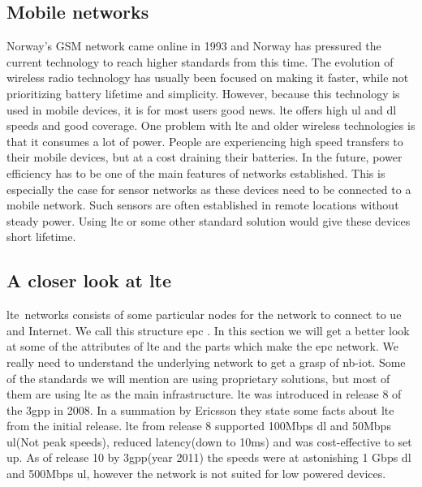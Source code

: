 \documentclass[USenglish]{ifimaster}  %
\begin{document}
\subsection{Mobile networks}
Norway's GSM network came online in 1993 \cite{online:gsmTelenorNetcom} and Norway has pressured the current technology to reach higher standards from this time. The evolution of wireless radio technology has usually been focused on making it faster, while not prioritizing battery lifetime and simplicity. However, because this technology is used in mobile devices, it is for most users good news. \acrshort{lte} offers high \acrfull{ul} and \acrfull{dl} speeds and good coverage. One problem with \acrshort{lte} and older wireless technologies is that it consumes a lot of power. People are experiencing high speed transfers to their mobile devices, but at a cost draining their batteries. In the future, power efficiency has to be one of the main features of networks established. This is especially the case for sensor networks as these devices need to be connected to a mobile network. Such sensors are often established in remote locations without steady power. Using \acrshort{lte} or some other standard solution would give these devices short lifetime.

\subsection{A closer look at \acrshort{lte}} \label{ssection:lte}
\acrfull{lte} networks consists of some particular nodes for the network to connect to \acrfull{ue} and Internet. We call this structure \acrfull{epc} \cite{online:epc}. In this section we will get a better look at some of the attributes of \acrshort{lte} and the parts which make the \acrshort{epc} network. We really need to understand the underlying network to get a grasp of \acrshort{nb-iot}. Some of the standards we will mention are using proprietary solutions, but most of them are using \acrshort{lte} as the main infrastructure. \acrshort{lte} was introduced in release 8 of the \acrshort{3gpp} in 2008. In a summation by Ericsson they state some facts about \acrshort{lte} from the initial release. \acrshort{lte} from release 8 supported 100Mbps \acrshort{dl} and 50Mbps \acrshort{ul}(Not peak speeds), reduced latency(down to 10ms) and was cost-effective to set up\cite{online:lteIntroduction}. As of release 10 by \acrshort{3gpp}(year 2011) the speeds were at astonishing 1 Gbps \acrshort{dl} and 500Mbps \acrshort{ul}, however the network is not suited for low powered devices.
\end{document}
